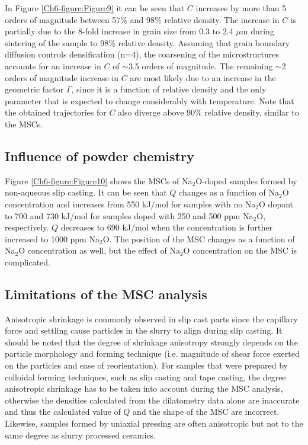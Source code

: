 \noindent In Figure \ref{Ch6-figure:Figure9} it can be seen that $C$ increases by more than 5 orders of magnitude between 57\% and 98\% relative density. The increase in $C$ is partially due to the 8-fold increase in grain size from 0.3 to 2.4 $\mu$m during sintering of the sample to 98\% relative density. Assuming that grain boundary diffusion controls densification (n=4), the coarsening of the microstructures accounts for an increase in $C$ of $\sim$3.5 orders of magnitude. The remaining $\sim$2 orders of magnitude increase in $C$ are most likely due to an increase in the geometric factor $\Gamma$, since it is a function of relative density and the only parameter that is expected to change considerably with temperature. Note that the obtained trajectories for $C$ also diverge above 90\% relative density, similar to the MSCs. 

		
\subsection{Influence of powder chemistry}
Figure \ref{Ch6-figure:Figure10} shows the MSCs of Na$_{2}$O-doped samples formed by non-aqueous slip casting. It can be seen that $Q$ changes as a function of Na$_{2}$O concentration and increases from 550 kJ/mol for samples with no Na$_{2}$O dopant to 700 and 730 kJ/mol for samples doped with 250 and 500 ppm Na$_{2}$O, respectively. $Q$ decreases to 690 kJ/mol when the concentration is further increased to 1000 ppm Na$_{2}$O. The position of the MSC changes as a function of Na$_{2}$O concentration as well, but the effect of Na$_{2}$O concentration on the MSC is complicated.

\subsection{Limitations of the MSC analysis}
Anisotropic shrinkage is commonly observed in slip cast parts since the capillary force and settling cause particles in the slurry to align during slip casting. It should be noted that the degree of shrinkage anisotropy strongly depends on the particle morphology and forming technique (i.e. magnitude of shear force exerted on the particles and ease of reorientation). For samples that were prepared by colloidal forming techniques, such as slip casting and tape casting, the degree anisotropic shrinkage has to be taken into account during the MSC analysis, otherwise the densities calculated from the dilatometry data alone are inaccurate and thus the calculated value of $Q$ and the shape of the MSC are incorrect. Likewise, samples formed by uniaxial pressing are often anisotropic but not to the same degree as slurry processed ceramics.

